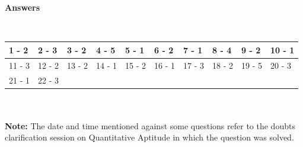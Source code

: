 \documentclass{article}
\begin{document}
\noindent  \\  
	

	\noindent \\  {\large  \textbf{Answers}}
	
	\noindent 
	
	\noindent  \\  
	
	\begin{tabular}{|p{0.7in}|p{0.5in}|p{0.5in}|p{0.5in}|p{0.5in}|p{0.5in}|p{0.5in}|p{0.5in}|p{0.5in}|p{0.5in}|} \hline 
		1 - 2 & 2 - 3 & 3 - 2 & 4 - 5 & 5 - 1 & 6 - 2 & 7 - 1 & 8 - 4 & 9 - 2 & 10 - 1 \\ \hline 
		11 - 3 & 12 - 2 & 13 - 2 & 14 - 1 & 15 - 2 & 16 - 1 & 17 - 3 & 18 - 2 & 19 - 5 & 20 - 3 \\ \hline 
		21 - 1 & 22 - 3 & \multicolumn{8}{|p{3.6in}|}{} \\ \hline 
	\end{tabular}
	
	
	
	\noindent 
	
	\noindent  \\  
	
	\noindent \\   \textbf{Note: }The date and time mentioned against some questions refer to the doubts clarification session on Quantitative Aptitude in which the question was solved.
	
	\noindent 
\end{document}
